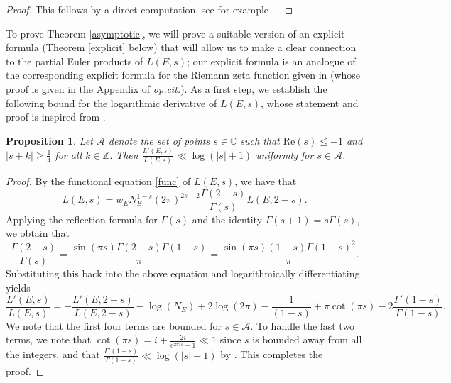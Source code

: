 \documentclass[12pt,reqno]{amsart}
\newtheorem{proposition}[theorem]{Proposition}
\theoremstyle{definition}
\numberwithin{equation}{section}
\renewcommand{\Re}{\mathrm{Re}}
\begin{document}
\begin{proof}
This follows by a direct computation, see for example ~\cite[Lemma 5.1.4]{Spicer2015}. 
\end{proof}

To prove Theorem \ref{asymptotic}, we will prove a suitable version of an explicit formula (Theorem \ref{explicit} below) that will allow us to make a clear connection to the partial Euler products of $L(E, s)$; our explicit formula is an analogue of the corresponding explicit formula for the Riemann zeta function given in \cite[Lemma 5.2]{Gor23} (whose proof is given in the Appendix of \textit{op.cit.}). As a first step, we establish the following bound for the logarithmic derivative of $L(E, s)$, whose statement and proof is inspired from \cite[Lemma 12.4]{MV07}. 


\begin{proposition} \label{stirling}
Let $ \mathcal A$ denote the set of points $s \in \mathbb C$ such that $\Re(s) \leq -1$ and $|s+k| \geq \frac{1}{4}$ for all $k \in \mathbb Z$. Then 
$\displaystyle 
{ \frac{L'(E, s) }{L(E, s)} \ll \log ( |s|+1) }$ uniformly for $s \in \mathcal A$. 
\end{proposition}

\begin{proof}
By the functional equation \eqref{func} of $L(E, s)$, we have that 
$$
L(E, s)= w_E N_E^{1-s} (2 \pi)^{2s-2} \frac{\Gamma(2-s)}{\Gamma(s)} L(E, 2-s). 
$$
Applying the reflection formula for $\Gamma(s)$ and the identity $\Gamma(s+1)=s \Gamma(s)$, we obtain that 
$$
\frac{\Gamma(2-s)}{\Gamma(s)} = \frac{ \sin(\pi s)  \Gamma(2-s) \Gamma(1-s) }{\pi}=  \frac{ \sin(\pi s)  (1-s) \Gamma(1-s)^2}{\pi}. 
$$
Substituting this back into the above equation and logarithmically differentiating yields 
\begin{equation*}
\frac{L'(E, s)}{L(E, s)}= -\frac{L'(E, 2-s)}{L(E, 2-s)}-\log(N_E)+2 \log (2 \pi) -\frac{1}{(1-s)} +\pi \cot(\pi s)- 2 \frac{\Gamma'(1-s)}{\Gamma(1-s)}. 
\end{equation*}
We note that the first four terms are bounded for $s \in \mathcal A$. To handle the last two terms, we note that $
\cot(\pi s)= i+\frac{2 i}{e^{2 \pi i s}-1} \ll 1
$
since $s$ is bounded away from all the integers, and that $\frac{\Gamma'(1-s)}{\Gamma(1-s)} \ll \log(|s|+1)$ by \cite[Theorem C.1]{MV07}. This completes the proof. 
\end{proof}
\end{document}

